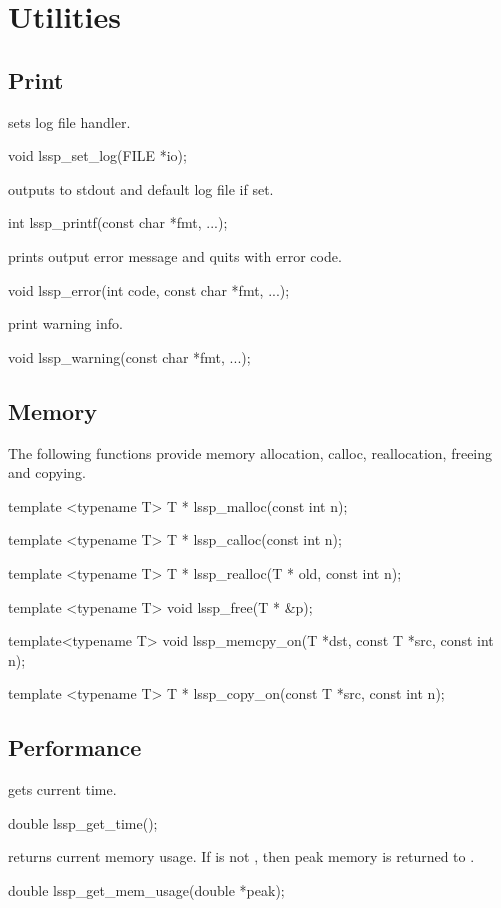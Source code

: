 \chapter{Utilities}

\section{Print}

 sets log file handler.
\begin{evb}
void lssp_set_log(FILE *io);
\end{evb}

 outputs to stdout and default log file if set.
\begin{evb}
int lssp_printf(const char *fmt, ...);
\end{evb}

 prints output error message and quits with error code.
\begin{evb}
void lssp_error(int code, const char *fmt, ...);
\end{evb}

 print warning info.
\begin{evb}
void lssp_warning(const char *fmt, ...);
\end{evb}

\section{Memory}
The following functions provide memory allocation, calloc, reallocation, freeing and copying.
\begin{evb}
template <typename T> T * lssp_malloc(const int n);

template <typename T> T * lssp_calloc(const int n);

template <typename T> T * lssp_realloc(T * old, const int n);

template <typename T> void lssp_free(T * &p);

template<typename T> void lssp_memcpy_on(T *dst, const T *src, const int n);

template <typename T> T * lssp_copy_on(const T *src, const int n);
\end{evb}

\section{Performance}

 gets current time.
\begin{evb}
double lssp_get_time();
\end{evb}

 returns current memory usage. If  is not ,
then peak memory is returned to .
\begin{evb}
double lssp_get_mem_usage(double *peak);
\end{evb}
